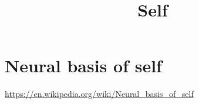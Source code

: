 \documentclass[a4paper]{article}
\title{Self}
\date{}
\begin{document}
    \maketitle
    
    \section{Neural basis of self}
        \url{https://en.wikipedia.org/wiki/Neural_basis_of_self}
\end{document}
